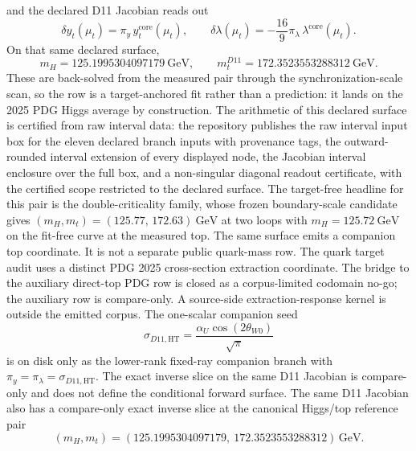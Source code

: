 \documentclass[11pt]{article}
\begin{document}
and the declared D11 Jacobian reads out
\[
\delta y_t(\mu_t)=\pi_y\,y_t^{\mathrm{core}}(\mu_t),
\qquad
\delta\lambda(\mu_t)=-\frac{16}{9}\pi_\lambda\,\lambda^{\mathrm{core}}(\mu_t).
\]
On that same declared surface,
\[
m_H=125.1995304097179~\mathrm{GeV},
\qquad
m_t^{D11}=172.3523553288312~\mathrm{GeV}.
\]
These are back-solved from the measured pair through the synchronization-scale
scan, so the row is a target-anchored fit rather than a prediction: it lands on
the 2025 PDG Higgs average by construction. The arithmetic of this declared
surface is certified from raw interval data: the repository publishes the raw
interval input box for the eleven declared branch inputs with provenance tags,
the outward-rounded interval extension of every displayed node, the Jacobian
interval enclosure over the full box, and a non-singular diagonal readout
certificate, with the certified scope restricted to the declared surface. The target-free headline for this
pair is the double-criticality family, whose frozen boundary-scale candidate
gives \((m_H,m_t)=(125.77,\,172.63)~\mathrm{GeV}\) at two loops with
\(m_H=125.72~\mathrm{GeV}\) on the fit-free curve at the measured top. The
same surface emits a companion top coordinate. It is not a separate public quark-mass row. The
quark target audit uses a distinct PDG 2025 cross-section extraction coordinate. The bridge to the auxiliary
direct-top PDG row is closed as a corpus-limited codomain no-go; the auxiliary row is compare-only.
A source-side extraction-response kernel is outside the emitted corpus.
The one-scalar companion seed
\[
\sigma_{D11,\mathrm{HT}}=\frac{\alpha_U\cos(2\theta_{W0})}{\sqrt{\pi}}
\]
is on disk only as the lower-rank fixed-ray companion branch with \(\pi_y=\pi_\lambda=\sigma_{D11,\mathrm{HT}}\). The exact inverse slice on the same D11 Jacobian is compare-only and does not define the conditional forward surface.
The same D11 Jacobian also has a compare-only exact inverse slice at the canonical Higgs/top reference pair
\[
(m_H,m_t)=
(125.1995304097179,\ 172.3523553288312)\,\mathrm{GeV}.
\]
\end{document}
